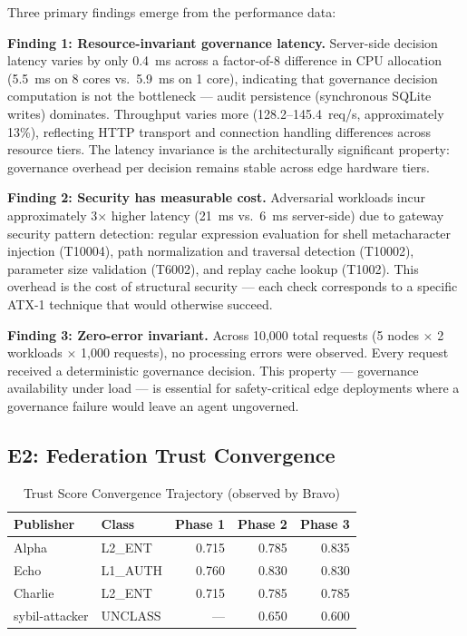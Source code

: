 \documentclass[journal]{IEEEtran}
\begin{document}
Three primary findings emerge from the performance data:

\textbf{Finding 1: Resource-invariant governance latency.} Server-side decision latency varies by only 0.4~ms across a factor-of-8 difference in CPU allocation (5.5~ms on 8 cores vs.\ 5.9~ms on 1 core), indicating that governance decision computation is not the bottleneck --- audit persistence (synchronous SQLite writes) dominates. Throughput varies more (128.2--145.4~req/s, approximately 13\%), reflecting HTTP transport and connection handling differences across resource tiers. The latency invariance is the architecturally significant property: governance overhead per decision remains stable across edge hardware tiers.

\textbf{Finding 2: Security has measurable cost.} Adversarial workloads incur approximately 3$\times$ higher latency (21~ms vs.\ 6~ms server-side) due to gateway security pattern detection: regular expression evaluation for shell metacharacter injection (T10004), path normalization and traversal detection (T10002), parameter size validation (T6002), and replay cache lookup (T1002). This overhead is the cost of structural security --- each check corresponds to a specific ATX-1 technique that would otherwise succeed.

\textbf{Finding 3: Zero-error invariant.} Across 10,000 total requests (5 nodes $\times$ 2 workloads $\times$ 1,000 requests), no processing errors were observed. Every request received a deterministic governance decision. This property --- governance availability under load --- is essential for safety-critical edge deployments where a governance failure would leave an agent ungoverned.

\subsection{E2: Federation Trust Convergence}

\begin{table}[t]
\centering
\caption{Trust Score Convergence Trajectory (observed by Bravo)}
\label{tab:trust_convergence}
\begin{tabular}{@{}llrrr@{}}
\toprule
\textbf{Publisher} & \textbf{Class} & \textbf{Phase 1} & \textbf{Phase 2} & \textbf{Phase 3} \\
\midrule
Alpha & L2\_ENT & 0.715 & 0.785 & 0.835 \\
Echo & L1\_AUTH & 0.760 & 0.830 & 0.830 \\
Charlie & L2\_ENT & 0.715 & 0.785 & 0.785 \\
sybil-attacker & UNCLASS & --- & 0.650 & 0.600 \\
\bottomrule
\end{tabular}
\end{table}
\end{document}
